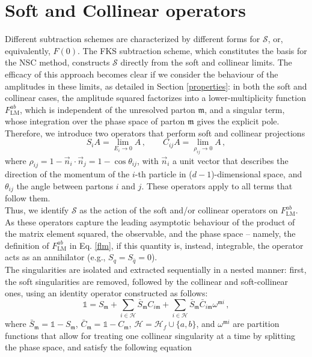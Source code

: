 \documentclass[a4paper, 12pt]{book}
\newcommand{\um}{\mathfrak{m}}
\begin{document}
\section{Soft and Collinear operators}
Different subtraction schemes are characterized by different forms for $\mathcal{S}$, or, equivalently, $F(0)$. The FKS subtraction scheme, which constitutes the basis for the NSC method, constructs $\mathcal{S}$ directly from the soft and collinear limits. The efficacy of this approach becomes clear if we consider the behaviour of the amplitudes in these limits, as detailed in Section \ref{properties}: in both the soft and collinear cases, the amplitude squared factorizes into a  lower-multiplicity function $F^{ab}_{\mathrm{LM}}$, which is independent of the unresolved parton $\um$, and a singular term, whose integration over the phase space of parton $\um$ gives the explicit pole. Therefore, we introduce two operators that perform soft and collinear projections
\begin{equation}
    S_i A = \lim_{E_i \to 0} A \, , \qquad C_{ij}A = \lim_{\rho_{ij}\to 0}A \, ,
    \label{projections}
\end{equation}
where $\rho_{ij}= 1 - \vec{n}_i \cdot \vec{n}_j = 1 - \cos{\theta_{ij}}$, with $\vec{n}_i$ a unit vector that describes the direction of the momentum of the $i$-th particle in ($d-1$)-dimensional space, and $\theta_{ij}$ the angle between partons $i$ and $j$. These operators apply to all terms that follow them. \\
Thus, we identify $\mathcal{S}$ as the action of the soft and/or collinear operators on $F^{ab}_{\mathrm{LM}}$. As these operators capture the leading asymptotic behaviour of the product of the matrix element squared, the observable, and the phase space – namely, the definition of $F^{ab}_{\mathrm{LM}}$ in Eq. \ref{flm}, if this quantity is, instead, integrable, the operator acts as an annihilator (e.g., $S_q = S_{\bar{q}}=0$). \\
The singularities are isolated and extracted sequentially in a nested manner: first, the soft singularities are removed, followed by the collinear and soft-collinear ones, using an identity operator constructed as follows:
\begin{equation}
    \mathbb{1} = S_\um + \sum_{i \in \mathcal{H}} \bar{ S}_\um C_{i\um} + \sum_{i \in \mathcal{H}} \bar{S}_\um \bar{C}_{i \um} \omega^{\um i} \, ,
\end{equation}
where $\bar{ S}_\um= \mathbb{1} - S_\um$, $\bar{ C}_\um= \mathbb{1} - C_\um$, $\mathcal{H} = \mathcal{H}_f \cup \{a,b\}$, and $\omega^{\um i}$ are partition functions that  allow for treating one collinear singularity at a time by splitting the phase space, and satisfy the following equation
\end{document}
